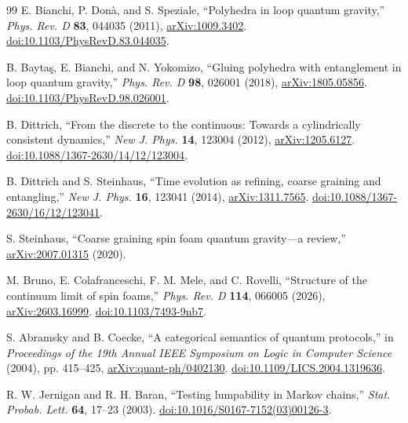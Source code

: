 \documentclass[11pt]{article}
\begin{document}
\begin{thebibliography}{99}
E. Bianchi, P. Don\`a, and S. Speziale,
``Polyhedra in loop quantum gravity,''
\emph{Phys. Rev. D} \textbf{83}, 044035 (2011),
\href{https://arxiv.org/abs/1009.3402}{arXiv:1009.3402}.
\href{https://doi.org/10.1103/PhysRevD.83.044035}{doi:10.1103/PhysRevD.83.044035}.

B. Bayta\c{s}, E. Bianchi, and N. Yokomizo,
``Gluing polyhedra with entanglement in loop quantum gravity,''
\emph{Phys. Rev. D} \textbf{98}, 026001 (2018),
\href{https://arxiv.org/abs/1805.05856}{arXiv:1805.05856}.
\href{https://doi.org/10.1103/PhysRevD.98.026001}{doi:10.1103/PhysRevD.98.026001}.

B. Dittrich,
``From the discrete to the continuous: Towards a cylindrically consistent dynamics,''
\emph{New J. Phys.} \textbf{14}, 123004 (2012),
\href{https://arxiv.org/abs/1205.6127}{arXiv:1205.6127}.
\href{https://doi.org/10.1088/1367-2630/14/12/123004}{doi:10.1088/1367-2630/14/12/123004}.

B. Dittrich and S. Steinhaus,
``Time evolution as refining, coarse graining and entangling,''
\emph{New J. Phys.} \textbf{16}, 123041 (2014),
\href{https://arxiv.org/abs/1311.7565}{arXiv:1311.7565}.
\href{https://doi.org/10.1088/1367-2630/16/12/123041}{doi:10.1088/1367-2630/16/12/123041}.

S. Steinhaus,
``Coarse graining spin foam quantum gravity---a review,''
\href{https://arxiv.org/abs/2007.01315}{arXiv:2007.01315} (2020).

M. Bruno, E. Colafranceschi, F. M. Mele, and C. Rovelli,
``Structure of the continuum limit of spin foams,''
\emph{Phys. Rev. D} \textbf{114}, 066005 (2026),
\href{https://arxiv.org/abs/2603.16999}{arXiv:2603.16999}.
\href{https://doi.org/10.1103/7493-9nb7}{doi:10.1103/7493-9nb7}.

S. Abramsky and B. Coecke,
``A categorical semantics of quantum protocols,''
in \emph{Proceedings of the 19th Annual IEEE Symposium on Logic in Computer Science} (2004), pp. 415--425,
\href{https://arxiv.org/abs/quant-ph/0402130}{arXiv:quant-ph/0402130}.
\href{https://doi.org/10.1109/LICS.2004.1319636}{doi:10.1109/LICS.2004.1319636}.


R. W. Jernigan and R. H. Baran,
``Testing lumpability in Markov chains,''
\emph{Stat. Probab. Lett.} \textbf{64}, 17--23 (2003).
\href{https://doi.org/10.1016/S0167-7152(03)00126-3}{doi:10.1016/S0167-7152(03)00126-3}.


\end{thebibliography}
\end{document}
